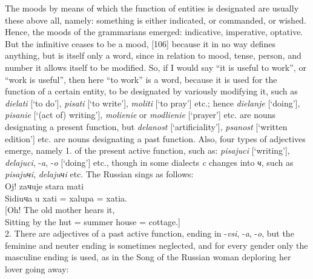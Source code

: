 The moods by means of which the function of entities is designated are usually these above all, namely: something is either indicated, or commanded, or wished. Hence, the moods of the grammarians emerged: indicative, imperative, optative. But the infinitive ceases to be a mood, [106] because it in no way defines anything, but is itself only a word, since in relation to mood, tense, person, and number it allows itself to be modified. So, if I would say “it is useful to work”, or “work is useful”, then here “to work” is a word, because it is used for the function of a certain entity, to be designated by variously modifying it, such as \textit{dielati} [‘to do’], \textit{pisati} [‘to write’], \textit{moliti} [‘to pray’] etc.; hence \textit{dielanje} [‘doing’], \textit{pisanie} [‘(act of) writing’], \textit{molienie} or \textit{modlienie} [‘prayer’] etc. are nouns designating a present function, but \textit{delanost} [‘artificiality’], \textit{psanost} [‘written edition’] etc. are nouns designating a past function. Also, four types of adjectives emerge, namely 1. of the present active function, such as: \textit{pisajuci} [‘writing’], \textit{delajuci}, -\textit{a}, -\textit{o} [‘doing’] etc., though in some dialects \textit{c} changes into \textit{ч}, such as \textit{pisajuчi}, \textit{delajuчi} etc. The Russian sings as follows: \\

\noindent\hspace*{1cm}Oj! zaчuje stara mati \\
\hspace*{1cm}Sidiuчa u xati = xalupa = xatia. \\
\hspace*{1cm}[Oh! The old mother hears it, \\
\hspace*{1cm}Sitting by the hut = summer house = cottage.] \\

2. There are adjectives of a past active function, ending in -\textit{vsi}, -\textit{a}, -\textit{o}, but the feminine and neuter ending is sometimes neglected, and for every gender only the masculine ending is used, as in the Song of the Russian woman deploring her lover going away:

